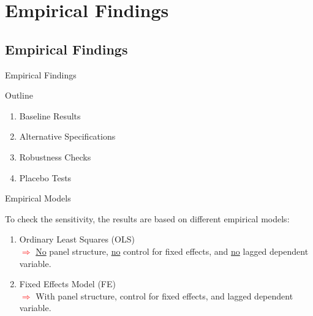 \documentclass{beamer}
\begin{document}
\section{Empirical Findings}



\subsection{Empirical Findings}

\begin{frame}[label=Main3]{Empirical Findings}
\vspace{-0.2cm}
\begin{block}{\centering \Large Outline}
\begin{enumerate}
\item \normalsize Baseline Results
\item \normalsize Alternative Specifications
\item \normalsize Robustness Checks
\item \normalsize Placebo Tests
\end{enumerate}
\end{block}

\vspace{10pt}
\begin{block}{\centering \Large Empirical Models}

\vspace{-2pt}
\begin{itemize}
{\scriptsize \item To check the sensitivity, the results are based on different empirical models:}
\end{itemize}
\vspace{-2pt}
\begin{enumerate}
\item \scriptsize Ordinary Least Squares (OLS)
\\ \tiny\textcolor{red}{$\Longrightarrow$} \underline{No} panel structure, \underline{no} control for fixed effects, and \underline{no} lagged dependent variable.
\item \scriptsize Fixed Effects Model (FE)
\\ \tiny\textcolor{red}{$\Longrightarrow$} With panel structure, control for fixed effects, and lagged dependent variable.
\end{enumerate}
\end{block} 
\end{frame}
\end{document}
